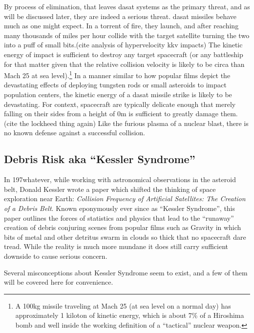 By process of elimination, that leaves \ac{dasat} systems as the
primary threat, and as will be discussed later, they are indeed a
serious threat.  \ac{dasat} missiles behave much as one might expect.
In a torrent of fire, they launch, and after reaching many thousands
of miles per hour collide with the target satellite turning the two
into a puff of small bits.(cite analysis of hypervelocity kkv impacts)
The kinetic energy of impact is sufficient to destroy any target
spacecraft (or any battleship for that matter given that the relative
collision velocity is likely to be circa than Mach 25 at sea
level).\footnote{A 100kg missile traveling at Mach 25 (at sea level on
a normal day) has approximately 1 kiloton of kinetic energy, which is
about 7\% of a Hiroshima bomb and well inside the working definition
of a ``tactical'' nuclear weapon.} In a manner similar to how popular
films depict the devastating effects of deploying tungsten rods or
small asteroids to impact population centers, the kinetic energy of a
\ac{dasat} missile strike is likely to be devastating.  For context,
spacecraft are typically delicate enough that merely falling on their
sides from a height of 0m is sufficient to greatly damage them.(cite
the lockheed thing again) Like the furious plasma of a nuclear blast,
there is no known defense against a successful collision.

\subsection{Debris Risk aka ``Kessler Syndrome''}

In 197whatever, while working with astronomical observations in the
asteroid belt, Donald Kessler wrote a paper which shifted the thinking
of space exploration near Earth: {\it Collision Frequency of
  Artificial Satellites: The Creation of a Debris
  Belt}.\cite{kessler-og} Known eponymously ever since as ``Kessler
Syndrome'', this paper outlines the forces of statistics and physics
that lead to the ``runaway'' creation of debris conjuring scenes from
popular films such as Gravity in which bits of metal and other
detritus swarm in clouds so thick that no spacecraft dare tread.
While the reality is much more mundane it does still carry sufficient
downside to cause serious concern.

Several misconceptions about Kessler Syndrome seem to exist, and a few
of them will be covered here for convenience.

